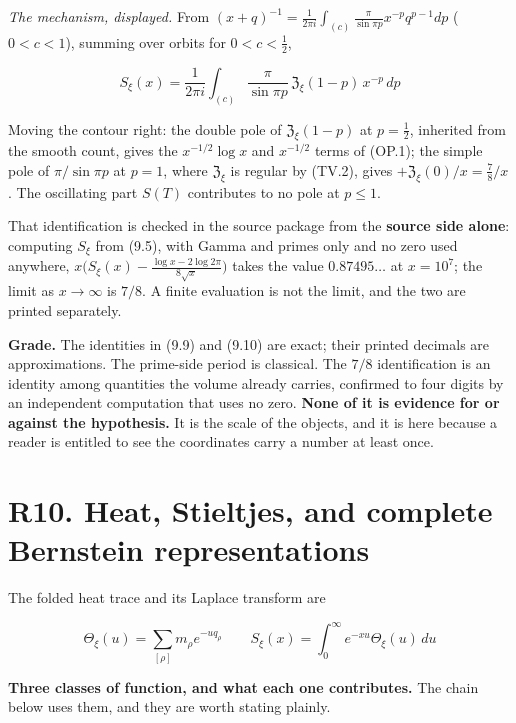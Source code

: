 \documentclass[
  11pt,
]{book}
\begin{document}
\emph{The mechanism, displayed.} From
\((x+q)^{-1}=\frac1{2\pi i}\int_{(c)}\frac{\pi}{\sin\pi p}x^{-p}q^{p-1}dp\)
(\(0<c<1\)), summing over orbits for \(0<c<\tfrac12\),

\[
S_\xi(x)=\frac1{2\pi i}\int_{(c)}\frac{\pi}{\sin\pi p}\,
\mathfrak Z_\xi(1-p)\,x^{-p}\,dp
\tag{9.11}
\]

Moving the contour right: the double pole of \(\mathfrak Z_\xi(1-p)\) at
\(p=\tfrac12\), inherited from the smooth count, gives the
\(x^{-1/2}\log x\) and \(x^{-1/2}\) terms of (OP.1); the simple pole of
\(\pi/\sin\pi p\) at \(p=1\), where \(\mathfrak Z_\xi\) is regular by
(TV.2), gives \(+\mathfrak Z_\xi(0)/x=\tfrac78/x\). The oscillating part
\(S(T)\) contributes to no pole at \(p\le1\).

That identification is checked in the source package from the
\textbf{source side alone}: computing \(S_\xi\) from (9.5), with Gamma
and primes only and no zero used anywhere,
\(x\bigl(S_\xi(x)-\frac{\log x-2\log2\pi}{8\sqrt x}\bigr)\) takes the
value \(0.87495\ldots\) at \(x=10^7\); the limit as \(x\to\infty\) is
\(7/8\). A finite evaluation is not the limit, and the two are printed
separately.

\textbf{Grade.} The identities in (9.9) and (9.10) are exact; their
printed decimals are approximations. The prime-side period is classical.
The \(7/8\) identification is an identity among quantities the volume
already carries, confirmed to four digits by an independent computation
that uses no zero. \textbf{None of it is evidence for or against the
hypothesis.} It is the scale of the objects, and it is here because a
reader is entitled to see the coordinates carry a number at least once.

\section{R10. Heat, Stieltjes, and complete Bernstein
representations}\label{r10.-heat-stieltjes-and-complete-bernstein-representations}

The folded heat trace and its Laplace transform are

\[
\Theta_\xi(u)=\sum_{[\rho]}m_\rho e^{-uq_\rho}
\qquad
S_\xi(x)=\int_0^\infty e^{-xu}\Theta_\xi(u)\,du
\tag{10.1}
\]

\textbf{Three classes of function, and what each one contributes.} The
chain below uses them, and they are worth stating plainly.
\end{document}
